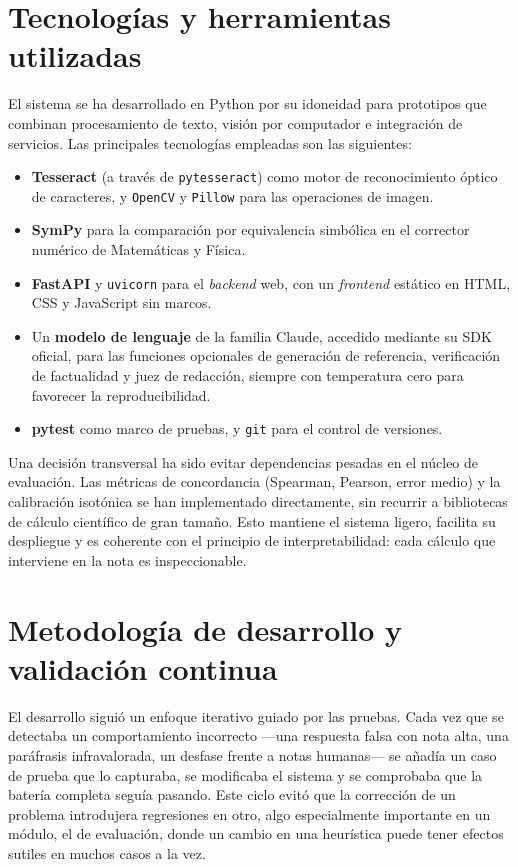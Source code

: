 \section{Tecnologías y herramientas utilizadas}

El sistema se ha desarrollado en Python por su idoneidad para prototipos que combinan procesamiento de texto, visión por computador e integración de servicios. Las principales tecnologías empleadas son las siguientes:

\begin{itemize}[leftmargin=1.4em]
  \item \textbf{Tesseract} (a través de \texttt{pytesseract}) como motor de reconocimiento óptico de caracteres, y \texttt{OpenCV} y \texttt{Pillow} para las operaciones de imagen.
  \item \textbf{SymPy} para la comparación por equivalencia simbólica en el corrector numérico de Matemáticas y Física.
  \item \textbf{FastAPI} y \texttt{uvicorn} para el \emph{backend} web, con un \emph{frontend} estático en HTML, CSS y JavaScript sin marcos.
  \item Un \textbf{modelo de lenguaje} de la familia Claude, accedido mediante su SDK oficial, para las funciones opcionales de generación de referencia, verificación de factualidad y juez de redacción, siempre con temperatura cero para favorecer la reproducibilidad.
  \item \textbf{pytest} como marco de pruebas, y \texttt{git} para el control de versiones.
\end{itemize}

Una decisión transversal ha sido evitar dependencias pesadas en el núcleo de evaluación. Las métricas de concordancia (Spearman, Pearson, error medio) y la calibración isotónica se han implementado directamente, sin recurrir a bibliotecas de cálculo científico de gran tamaño. Esto mantiene el sistema ligero, facilita su despliegue y es coherente con el principio de interpretabilidad: cada cálculo que interviene en la nota es inspeccionable.

\section{Metodología de desarrollo y validación continua}

El desarrollo siguió un enfoque iterativo guiado por las pruebas. Cada vez que se detectaba un comportamiento incorrecto —una respuesta falsa con nota alta, una paráfrasis infravalorada, un desfase frente a notas humanas— se añadía un caso de prueba que lo capturaba, se modificaba el sistema y se comprobaba que la batería completa seguía pasando. Este ciclo evitó que la corrección de un problema introdujera regresiones en otro, algo especialmente importante en un módulo, el de evaluación, donde un cambio en una heurística puede tener efectos sutiles en muchos casos a la vez.


